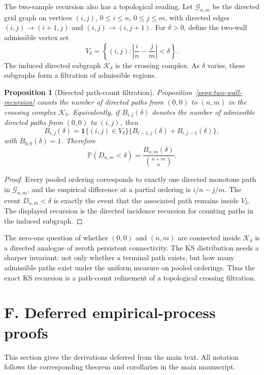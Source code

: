 \documentclass[12pt]{article}
\newtheorem{proposition}[theorem]{Proposition}
\theoremstyle{remark}
\newcommand{\Prob}{\mathbb{P}}
\begin{document}
The two-sample recursion also has a topological reading. Let
$\mathcal{G}_{n,m}$ be the directed grid graph on vertices
$(i,j)$, $0\le i\le n$, $0\le j\le m$, with directed edges
$(i,j)\to(i+1,j)$ and $(i,j)\to(i,j+1)$. For $\delta>0$, define the
two-wall admissible vertex set
\[
V_\delta=\left\{(i,j):\left|\frac{i}{n}-\frac{j}{m}\right|<\delta\right\}.
\]
The induced directed subgraph $\mathcal{K}_\delta$ is the crossing complex.
As $\delta$ varies, these subgraphs form a filtration of admissible regions.

\begin{proposition}[Directed path-count filtration]
\label{prop:crossing-complex}
Proposition~\ref{prop:two-wall-recursion} counts the number of directed paths
from $(0,0)$ to $(n,m)$ in the crossing complex $\mathcal{K}_\delta$.
Equivalently, if $B_{i,j}(\delta)$ denotes the number of admissible directed
paths from $(0,0)$ to $(i,j)$, then
\[
B_{i,j}(\delta)=
\mathbf 1\{(i,j)\in V_\delta\}\{B_{i-1,j}(\delta)+B_{i,j-1}(\delta)\},
\]
with $B_{0,0}(\delta)=1$. Therefore
\[
\Prob(D_{n,m}<\delta)=\frac{B_{n,m}(\delta)}{\binom{n+m}{n}}.
\]
\end{proposition}

\begin{proof}
Every pooled ordering corresponds to exactly one directed monotone path in
$\mathcal{G}_{n,m}$, and the empirical difference at a partial ordering is
$i/n-j/m$. The event $D_{n,m}<\delta$ is exactly the event that the associated
path remains inside $V_\delta$. The displayed recursion is the directed
incidence recursion for counting paths in the induced subgraph.
\end{proof}

The zero-one question of whether $(0,0)$ and $(n,m)$ are connected inside
$\mathcal{K}_\delta$ is a directed analogue of zeroth persistent connectivity.
The KS distribution needs a sharper invariant: not only whether a terminal path
exists, but how many admissible paths exist under the uniform measure on pooled
orderings. Thus the exact KS recursion is a path-count refinement of a
topological crossing filtration.

\section*{F. Deferred empirical-process proofs}

This section gives the derivations deferred from the main text. All notation
follows the corresponding theorem and corollaries in the main manuscript.
\end{document}
